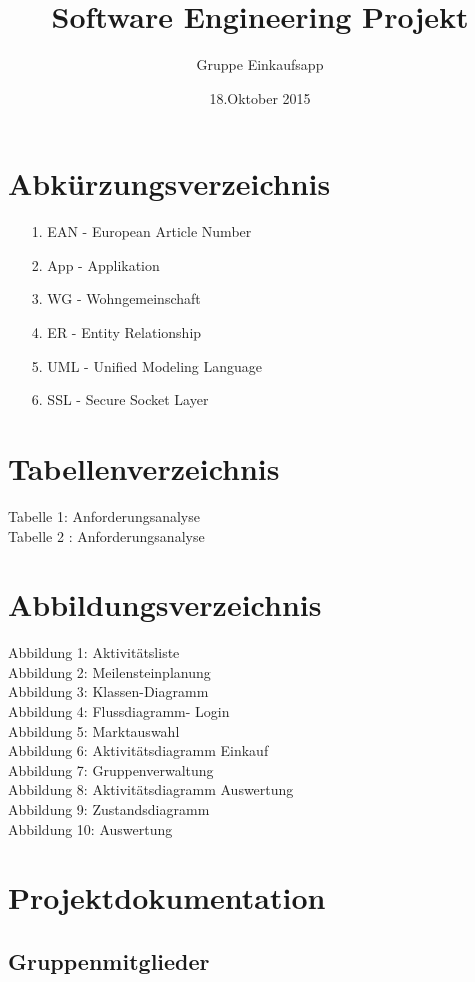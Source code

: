 \documentclass[12pt,a4paper]{article}
\begin{document}
\title{Software Engineering Projekt}
\author{Gruppe Einkaufsapp}
\date {18.Oktober 2015}
\maketitle
\newpage
\tableofcontents
\newpage
\newpage
\section*{Abkürzungsverzeichnis}
\begin{itemize}
\item[1.] EAN - European Article Number
\item[2.] App - Applikation
\item[3.] WG - Wohngemeinschaft
\item[4.] ER - Entity Relationship
\item[5.] UML  - Unified Modeling Language
\item[6.] SSL - Secure Socket Layer 
\end{itemize}
\newpage
\section*{Tabellenverzeichnis}
Tabelle 1: Anforderungsanalyse
\\
Tabelle 2 : Anforderungsanalyse
\newpage
\section*{Abbildungsverzeichnis}
Abbildung 1: Aktivitätsliste
\\
Abbildung 2: Meilensteinplanung
\\
Abbildung 3: Klassen-Diagramm
\\
Abbildung 4: Flussdiagramm- Login
\\
Abbildung 5: Marktauswahl
\\
Abbildung 6: Aktivitätsdiagramm Einkauf
\\
Abbildung 7: Gruppenverwaltung
\\
Abbildung 8: Aktivitätsdiagramm Auswertung
\\
Abbildung 9: Zustandsdiagramm
\\
Abbildung 10: Auswertung

\newpage
\section*{Projektdokumentation}
\subsection*{Gruppenmitglieder}
\end{document}
